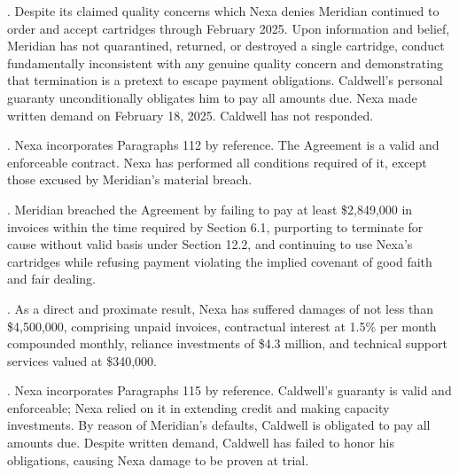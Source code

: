 \documentclass[12pt,letterpaper]{article}
\begin{document}
.\hspace{0.5em} Despite its claimed quality concerns \textemdash{} which Nexa denies \textemdash{} Meridian continued to order and accept cartridges through February 2025. Upon information and belief, Meridian has not quarantined, returned, or destroyed a single cartridge, conduct fundamentally inconsistent with any genuine quality concern and demonstrating that termination is a pretext to escape payment obligations. Caldwell's personal guaranty unconditionally obligates him to pay all amounts due. Nexa made written demand on February 18, 2025. Caldwell has not responded.



.\hspace{0.5em} Nexa incorporates Paragraphs 1\textendash{}12 by reference. The Agreement is a valid and enforceable contract. Nexa has performed all conditions required of it, except those excused by Meridian's material breach.

.\hspace{0.5em} Meridian breached the Agreement by failing to pay at least \$2,849,000 in invoices within the time required by Section 6.1, purporting to terminate for cause without valid basis under Section 12.2, and continuing to use Nexa's cartridges while refusing payment \textemdash{} violating the implied covenant of good faith and fair dealing.

.\hspace{0.5em} As a direct and proximate result, Nexa has suffered damages of not less than \$4,500,000, comprising unpaid invoices, contractual interest at 1.5\% per month compounded monthly, reliance investments of \$4.3 million, and technical support services valued at \$340,000.


.\hspace{0.5em} Nexa incorporates Paragraphs 1\textendash{}15 by reference. Caldwell's guaranty is valid and enforceable; Nexa relied on it in extending credit and making capacity investments. By reason of Meridian's defaults, Caldwell is obligated to pay all amounts due. Despite written demand, Caldwell has failed to honor his obligations, causing Nexa damage to be proven at trial.
\end{document}
